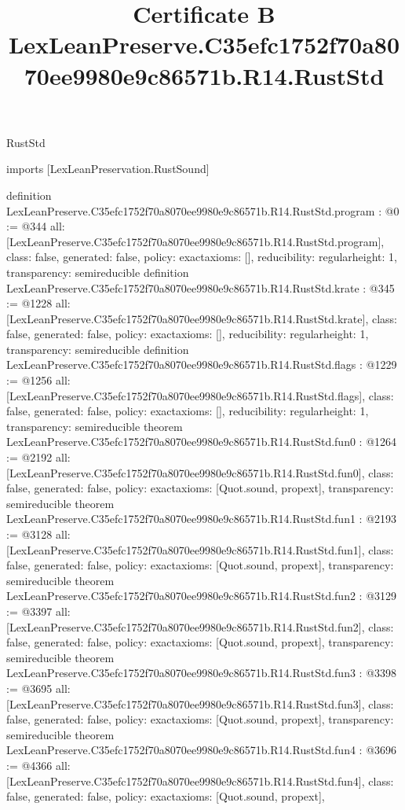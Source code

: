 \begin{lexlean}{RustStd}
\title{Certificate B LexLeanPreserve.C35efc1752f70a8070ee9980e9c86571b.R14.RustStd}
\begin{coremodule}
imports [LexLeanPreservation.RustSound]

definition LexLeanPreserve.C35efc1752f70a8070ee9980e9c86571b.R14.RustStd.program : @0 := @344 {
  all: [LexLeanPreserve.C35efc1752f70a8070ee9980e9c86571b.R14.RustStd.program],
  class: false,
  generated: false,
  policy: exact{axioms: []},
  reducibility: regular{height: 1},
  transparency: semireducible
}
definition LexLeanPreserve.C35efc1752f70a8070ee9980e9c86571b.R14.RustStd.krate : @345 := @1228 {
  all: [LexLeanPreserve.C35efc1752f70a8070ee9980e9c86571b.R14.RustStd.krate],
  class: false,
  generated: false,
  policy: exact{axioms: []},
  reducibility: regular{height: 1},
  transparency: semireducible
}
definition LexLeanPreserve.C35efc1752f70a8070ee9980e9c86571b.R14.RustStd.flags : @1229 := @1256 {
  all: [LexLeanPreserve.C35efc1752f70a8070ee9980e9c86571b.R14.RustStd.flags],
  class: false,
  generated: false,
  policy: exact{axioms: []},
  reducibility: regular{height: 1},
  transparency: semireducible
}
theorem LexLeanPreserve.C35efc1752f70a8070ee9980e9c86571b.R14.RustStd.fun0 : @1264 := @2192 {
  all: [LexLeanPreserve.C35efc1752f70a8070ee9980e9c86571b.R14.RustStd.fun0],
  class: false,
  generated: false,
  policy: exact{axioms: [Quot.sound, propext]},
  transparency: semireducible
}
theorem LexLeanPreserve.C35efc1752f70a8070ee9980e9c86571b.R14.RustStd.fun1 : @2193 := @3128 {
  all: [LexLeanPreserve.C35efc1752f70a8070ee9980e9c86571b.R14.RustStd.fun1],
  class: false,
  generated: false,
  policy: exact{axioms: [Quot.sound, propext]},
  transparency: semireducible
}
theorem LexLeanPreserve.C35efc1752f70a8070ee9980e9c86571b.R14.RustStd.fun2 : @3129 := @3397 {
  all: [LexLeanPreserve.C35efc1752f70a8070ee9980e9c86571b.R14.RustStd.fun2],
  class: false,
  generated: false,
  policy: exact{axioms: [Quot.sound, propext]},
  transparency: semireducible
}
theorem LexLeanPreserve.C35efc1752f70a8070ee9980e9c86571b.R14.RustStd.fun3 : @3398 := @3695 {
  all: [LexLeanPreserve.C35efc1752f70a8070ee9980e9c86571b.R14.RustStd.fun3],
  class: false,
  generated: false,
  policy: exact{axioms: [Quot.sound, propext]},
  transparency: semireducible
}
theorem LexLeanPreserve.C35efc1752f70a8070ee9980e9c86571b.R14.RustStd.fun4 : @3696 := @4366 {
  all: [LexLeanPreserve.C35efc1752f70a8070ee9980e9c86571b.R14.RustStd.fun4],
  class: false,
  generated: false,
  policy: exact{axioms: [Quot.sound, propext]},
}
\end{coremodule}
\end{lexlean}
